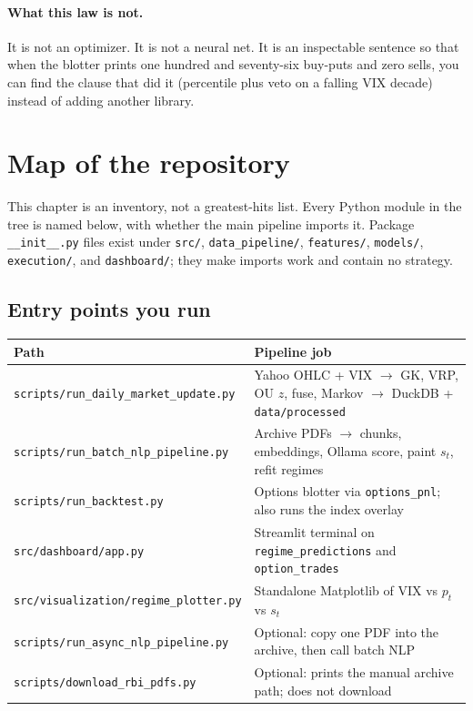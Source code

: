 \documentclass[11pt,a4paper]{article}
\begin{document}
\paragraph{What this law is not.}
It is not an optimizer. It is not a neural net. It is an inspectable sentence so that when the blotter prints one hundred and seventy-six buy-puts and zero sells, you can find the clause that did it (percentile plus veto on a falling VIX decade) instead of adding another library.

\section{Map of the repository}
\label{ch:repo}

This chapter is an inventory, not a greatest-hits list. Every Python module in the tree is named below, with whether the main pipeline imports it. Package \texttt{\_\_init\_\_.py} files exist under \texttt{src/}, \texttt{data\_pipeline/}, \texttt{features/}, \texttt{models/}, \texttt{execution/}, and \texttt{dashboard/}; they make imports work and contain no strategy.

\subsection{Entry points you run}

\begin{center}
\begin{tabular}{@{}p{}p{}@{}}
\toprule
Path & Pipeline job \\
\midrule
\texttt{scripts/run\_daily\_market\_update.py} & Yahoo OHLC + VIX $\to$ GK, VRP, OU $z$, fuse, Markov $\to$ DuckDB + \texttt{data/processed} \\
\texttt{scripts/run\_batch\_nlp\_pipeline.py} & Archive PDFs $\to$ chunks, embeddings, Ollama score, paint $s_t$, refit regimes \\
\texttt{scripts/run\_backtest.py} & Options blotter via \texttt{options\_pnl}; also runs the index overlay \\
\texttt{src/dashboard/app.py} & Streamlit terminal on \texttt{regime\_predictions} and \texttt{option\_trades} \\
\texttt{src/visualization/regime\_plotter.py} & Standalone Matplotlib of VIX vs $p_t$ vs $s_t$ \\
\texttt{scripts/run\_async\_nlp\_pipeline.py} & Optional: copy one PDF into the archive, then call batch NLP \\
\texttt{scripts/download\_rbi\_pdfs.py} & Optional: prints the manual archive path; does not download \\
\bottomrule
\end{tabular}
\end{center}
\end{document}
